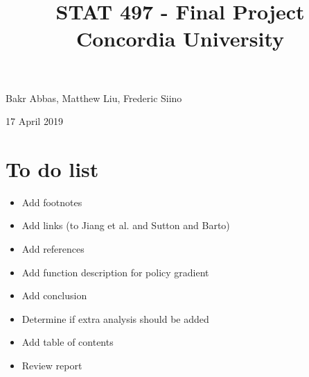 \documentclass[a4paper,12pt]{article}
\title{
{STAT 497 - Final Project} \\
{\large Concordia University} \\
}
\date{}
\begin{document}
\begin{titlingpage}
  \maketitle
  \centering
  \vfill
  {\large{Bakr Abbas, Matthew Liu, Frederic Siino}} \par
  {\large{17 April 2019}}
\end{titlingpage}

\newpage

\tableofcontents
\newpage

\section{To do list}

\begin{itemize}
  \item Add footnotes
  \item Add links (to Jiang et al. and Sutton and Barto)
  \item Add references
  \item Add function description for policy gradient
  \item Add conclusion
  \item Determine if extra analysis should be added
  \item Add table of contents
  \item Review report
\end{itemize}

\newpage
\end{document}
